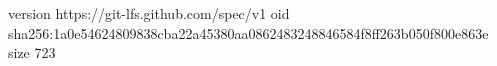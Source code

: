 version https://git-lfs.github.com/spec/v1
oid sha256:1a0e54624809838cba22a45380aa0862483248846584f8ff263b050f800e863e
size 723
